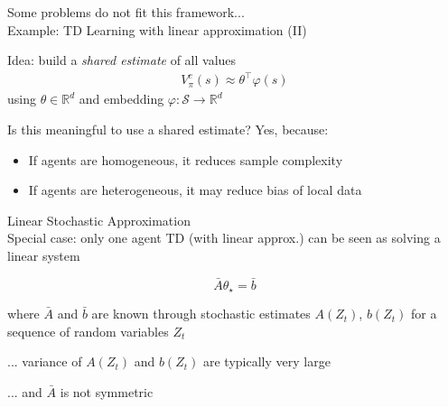 \documentclass[aspectratio=169,14pt]{beamer}
\begin{document}
\begin{frame}{Some problems do not fit this framework...\\[-0.5em]
    \large Example: TD Learning with linear approximation (II)}

  Idea: build a \emph{shared estimate} of all values
  \begin{align*}
    V^{c}_{\pi}(s) \approx \theta^\top \varphi(s)
  \end{align*}
  using $\theta \in \mathbb{R}^d$ and embedding $\varphi: \mathcal{S} \rightarrow \mathbb{R}^d$

  \vspace{1em}
  
  \pause

  Is this meaningful to use a shared estimate? Yes, because:
  \begin{itemize}
  \item If agents are homogeneous, it reduces sample complexity
  \item If agents are heterogeneous, it may reduce bias of local data
  \end{itemize}
\end{frame}


\begin{frame}{Linear Stochastic Approximation\\[-0.5em]
    \normalsize Special case: only one agent}
  TD (with linear approx.) can be seen as solving a linear system
  
  \begin{equation*}
    \bar{A} \theta_\star
    = 
    \bar{b}
  \end{equation*}

  \pause
  
  where $\bar{A}$ and $\bar{b}$ are known through stochastic estimates $A(Z_t)$, $b(Z_t)$
  for a sequence of random variables $Z_t$

  \pause
  \vspace{-0.5em}

  ... variance of $A(Z_t)$ and $b(Z_t)$ are typically very large

  \vspace{-0.5em}
  
  ... and $\bar{A}$ is not symmetric
  
  \vspace{0.5em}


\end{frame}
\end{document}
